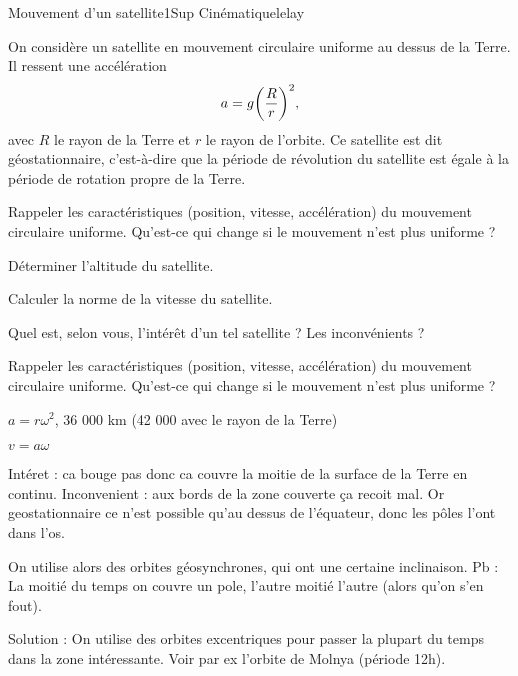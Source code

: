 \begin{exercise}{Mouvement d'un satellite}{1}{Sup}
{Cinématique}{lelay}

On considère un satellite en mouvement circulaire uniforme au dessus de la Terre. Il ressent une accélération 
$$a = g \qty(\dfrac{R}{r})^2,$$
avec $R$ le rayon de la Terre et $r$ le rayon de l'orbite. Ce satellite est dit géostationnaire, c'est-à-dire que la période de révolution du satellite est égale à la période de rotation propre de la Terre.


\begin{questions}
    \questioncours Rappeler les caractéristiques (position, vitesse, accélération) du mouvement circulaire uniforme. Qu'est-ce qui change si le mouvement n'est plus uniforme ?
    
    \question Déterminer l'altitude du satellite.
    
    \question Calculer la norme de la vitesse du satellite.
    
    \question Quel est, selon vous, l'intérêt d'un tel satellite ? Les inconvénients ?
\end{questions}

\end{exercise}

\begin{solution}

\begin{questions}
    \questioncours Rappeler les caractéristiques (position, vitesse, accélération) du mouvement circulaire uniforme. Qu'est-ce qui change si le mouvement n'est plus uniforme ?
    
    \question $a = r\omega^2$, 36 000 km (42 000 avec le rayon de la Terre)
    
    \question $v = a\omega$
    
    \question Intéret : ca bouge pas donc ca couvre la moitie de la surface de la Terre en continu. Inconvenient : aux bords de la zone couverte ça recoit mal. Or geostationnaire ce n'est possible qu'au dessus de l'équateur, donc les pôles l'ont dans l'os. 
    
    On utilise alors des orbites géosynchrones, qui ont une certaine inclinaison. Pb : La moitié du temps on couvre un pole, l'autre moitié l'autre (alors qu'on s'en fout).
    
    Solution : On utilise des orbites excentriques pour passer la plupart du temps dans la zone intéressante. Voir par ex l'orbite de Molnya (période 12h).
\end{questions}

\end{solution}
